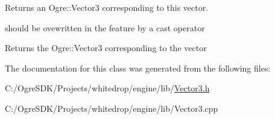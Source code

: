 Returns an Ogre\+::\+Vector3 corresponding to this vector. 

should be ovewritten in the feature by a cast operator \begin{DoxyReturn}{Returns}
the Ogre\+::\+Vector3 corresponding to the vector 
\end{DoxyReturn}


The documentation for this class was generated from the following files\+:\begin{DoxyCompactItemize}
\item 
C\+:/\+Ogre\+S\+D\+K/\+Projects/whitedrop/engine/lib/\hyperlink{_vector3_8h}{Vector3.\+h}\item 
C\+:/\+Ogre\+S\+D\+K/\+Projects/whitedrop/engine/lib/Vector3.\+cpp\end{DoxyCompactItemize}
